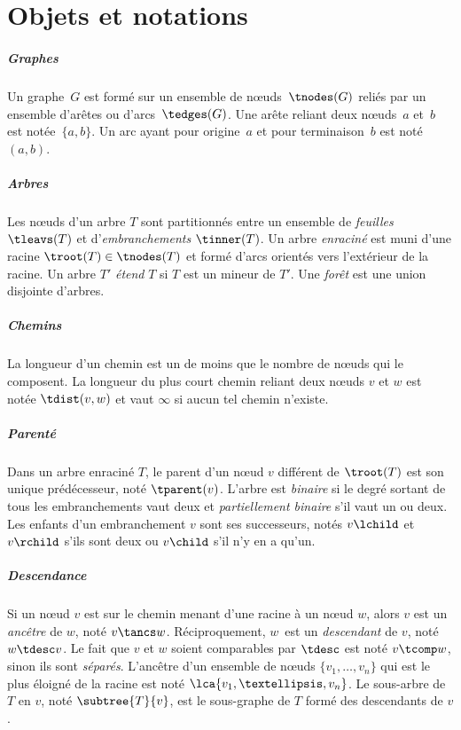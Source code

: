 \twocolumn
\chapter*{Objets et notations}

\paragraph{Graphes}
Un graphe~\(G\) est formé sur un ensemble de nœuds~\(\tnodes(G)\) reliés par un ensemble d’arêtes ou d’arcs~\(\tedges(G)\).
Une arête reliant deux nœuds~\(a\) et~\(b\) est notée~\(\{a, b\}\).
Un arc ayant pour origine~\(a\) et pour terminaison~\(b\) est noté~\((a, b)\).

\paragraph{Arbres}
Les nœuds d’un arbre \(T\) sont partitionnés entre un ensemble de \emph{feuilles} \(\tleavs(T)\) et d’\emph{embranchements} \(\tinner(T)\).
Un arbre \emph{enraciné} est muni d’une racine \(\troot(T) \in \tnodes(T)\) et formé d’arcs orientés vers l’extérieur de la racine.
Un arbre \(T'\) \emph{étend} \(T\) si \(T\) est un mineur de \(T'\).
Une \emph{forêt} est une union disjointe d’arbres.

\paragraph{Chemins}
La longueur d’un chemin est un de moins que le nombre de nœuds qui le composent.
La longueur du plus court chemin reliant deux nœuds \(v\) et \(w\) est notée \(\tdist(v, w)\) et vaut \(\infty\) si aucun tel chemin n’existe.

\vfill\break
\paragraph{Parenté}
Dans un arbre enraciné \(T\), le parent d’un nœud \(v\) différent de \(\troot(T)\) est son unique prédécesseur, noté \(\tparent(v)\).
L’arbre est \emph{binaire} si le degré sortant de tous les embranchements vaut deux et \emph{partiellement binaire} s’il vaut un ou deux.
Les enfants d’un embranchement \(v\) sont ses successeurs, notés \(v\lchild\) et \(v\rchild\) s’ils sont deux ou \(v\child\) s’il n’y en a qu’un.

\paragraph{Descendance}
Si un nœud \(v\) est sur le chemin menant d’une racine à un nœud \(w\), alors \(v\) est un \emph{ancêtre} de \(w\), noté \(v \tancs w\).
Réciproquement, \(w\)~est un \emph{descendant} de \(v\), noté \(w \tdesc v\).
Le fait que \(v\) et \(w\) soient comparables par \(\tdesc\) est noté \(v \tcomp w\), sinon ils sont \emph{séparés}.
L’ancêtre d’un ensemble de nœuds \(\{v_1, …, v_n\}\) qui est le plus éloigné de la racine est noté \(\lca\{v_1, …, v_n\}\).
Le sous-arbre de \(T\) en \(v\), noté \(\subtree{T}{v}\), est le sous-graphe de \(T\) formé des descendants de \(v\).

\onecolumn
